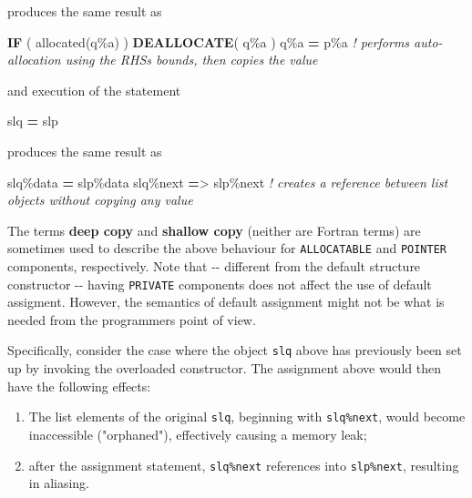 \documentclass[
]{scrartcl}
\newenvironment{Shaded}{}{}
\newcommand{\CommentTok}[1]{\textcolor[rgb]{0.38,0.63,0.69}{\textit{#1}}}
\newcommand{\FunctionTok}[1]{\textcolor[rgb]{0.02,0.16,0.49}{#1}}
\newcommand{\KeywordTok}[1]{\textcolor[rgb]{0.00,0.44,0.13}{\textbf{#1}}}
\newcommand{\NormalTok}[1]{#1}
\newcommand{\OperatorTok}[1]{\textcolor[rgb]{0.40,0.40,0.40}{#1}}
\providecommand{\tightlist}{%
  \setlength{\itemsep}{0pt}\setlength{\parskip}{0pt}}
\begin{document}
produces the same result as

\begin{Shaded}
\begin{Highlighting}[]
\KeywordTok{IF}\NormalTok{ ( }\FunctionTok{allocated}\NormalTok{(q}\OperatorTok{\%}\NormalTok{a) ) }\KeywordTok{DEALLOCATE}\NormalTok{( q}\OperatorTok{\%}\NormalTok{a )}
\NormalTok{q}\OperatorTok{\%}\NormalTok{a }\KeywordTok{=}\NormalTok{ p}\OperatorTok{\%}\NormalTok{a  }\CommentTok{! performs auto{-}allocation using the RHS\textquotesingle{}s bounds, then copies the value}
\end{Highlighting}
\end{Shaded}

and execution of the statement

\begin{Shaded}
\begin{Highlighting}[]
\NormalTok{slq }\KeywordTok{=}\NormalTok{ slp}
\end{Highlighting}
\end{Shaded}

produces the same result as

\begin{Shaded}
\begin{Highlighting}[]
\NormalTok{slq}\OperatorTok{\%}\NormalTok{data }\KeywordTok{=}\NormalTok{ slp}\OperatorTok{\%}\NormalTok{data}
\NormalTok{slq}\OperatorTok{\%}\NormalTok{next }\KeywordTok{=}\OperatorTok{\textgreater{}}\NormalTok{ slp}\OperatorTok{\%}\NormalTok{next  }\CommentTok{! creates a reference between list objects without copying any value}
\end{Highlighting}
\end{Shaded}

The terms \textbf{deep copy} and \textbf{shallow copy} (neither are
Fortran terms) are sometimes used to describe the above behaviour for
\texttt{ALLOCATABLE} and \texttt{POINTER} components, respectively. Note
that -\/- different from the default structure constructor -\/- having
\texttt{PRIVATE} components does not affect the use of default
assigment. However, the semantics of default assignment might not be
what is needed from the programmer\textquotesingle s point of view.

Specifically, consider the case where the object \texttt{slq} above has
previously been set up by invoking the overloaded constructor. The
assignment above would then have the following effects:

\begin{enumerate}
\def\labelenumi{\arabic{enumi}.}
\tightlist
\item
  The list elements of the original \texttt{slq}, beginning with
  \texttt{slq\%next}, would become inaccessible ("orphaned"),
  effectively causing a memory leak;
\item
  after the assignment statement, \texttt{slq\%next} references into
  \texttt{slp\%next}, resulting in aliasing.
\end{enumerate}
\end{document}
